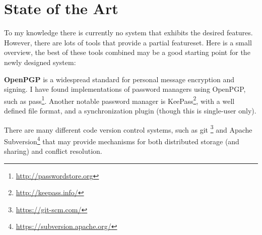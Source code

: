 \section{State of the Art}

To my knowledge there is currently no system that exhibits the desired
features. However, there are lots of tools that provide a partial featureset.
Here is a small overview, the best of these tools combined may be a good
starting point for the newly designed system:

\textbf{OpenPGP}\cite{openpgp} is a widespread standard for personal message
encryption and signing. I have found implementations of password managers using
OpenPGP, such as pass\footnote{\url{http://passwordstore.org}}. Another notable
password manager is KeePass\footnote{\url{http://keepass.info/}}, with a well
defined file format, and a synchronization plugin (though this is single-user
only).

There are many different code version control systems, such as git
\footnote{\url{https://git-scm.com/}} and Apache
Subversion\footnote{\url{https://subversion.apache.org/}} that may provide
mechanisms for both distributed storage (and sharing) and conflict resolution.
